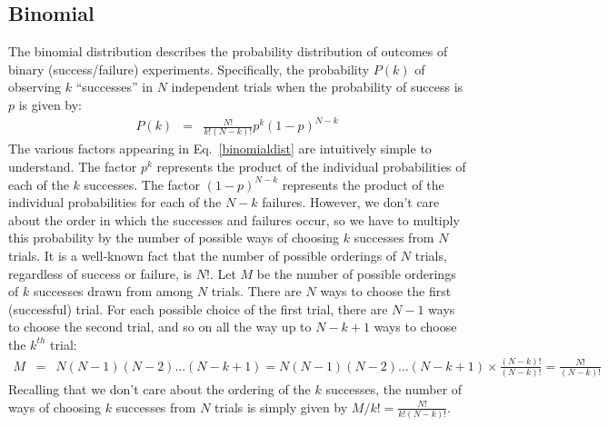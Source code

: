 \documentclass{revtex4}
\begin{document}
\subsection{Binomial}
The binomial distribution describes the probability distribution of outcomes of
binary (success/failure) experiments. Specifically, the probability
$P(k)$ of observing $k$ ``successes'' in $N$ independent trials when the
probability of success is $p$ is given by:
\begin{eqnarray}
  P(k) &=& \frac{N!}{k!\left(N-k\right)!} p^k (1-p)^{N-k} \label{binomialdist}
\end{eqnarray}
The various factors appearing in Eq.~\eqref{binomialdist} are
intuitively simple to understand. The factor $p^k$ represents the product of the
individual probabilities of each of the $k$ successes. The factor
$(1-p)^{N-k}$ represents the product of the individual probabilities
for each of the $N-k$ failures. However, we don't care about the order
in which the successes and failures occur, so we have to multiply this
probability by the number of possible ways of choosing $k$ successes
from $N$ trials. It is a well-known fact that the number of possible
orderings of $N$ trials, regardless of success or failure, is
$N!$. Let $M$ be the number of possible orderings of $k$ successes
drawn from among $N$ trials. There are $N$ ways to choose the first
(successful) trial. For each possible choice of the first trial, there
are $N-1$ ways to choose the second trial, and so on all the way up to $N - k + 1$ ways to choose
the $k^{th}$ trial: 
\begin{eqnarray}
  M &=& N (N-1) (N-2) \ldots (N-k + 1) = N (N-1) (N-2) \ldots (N-k +
  1) \times \frac{(N-k)!}{(N-k)!} = \frac{N!}{(N-k)!}
\end{eqnarray}
Recalling that we don't care about the ordering of the $k$ successes,
the number of ways of choosing $k$ successes from $N$ trials is simply
given by $M/k! = \frac{N!}{k!(N-k)!}$.
\end{document}
